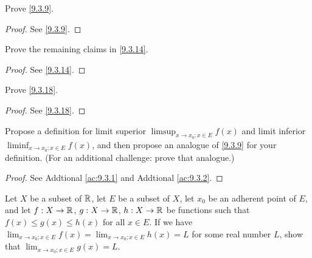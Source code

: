 \exercisesection

\begin{ex}\label{ex:9.3.1}
  Prove \cref{9.3.9}.
\end{ex}

\begin{proof}
  See \cref{9.3.9}.
\end{proof}

\begin{ex}\label{ex:9.3.2}
  Prove the remaining claims in \cref{9.3.14}.
\end{ex}

\begin{proof}
  See \cref{9.3.14}.
\end{proof}

\begin{ex}\label{ex:9.3.3}
  Prove \cref{9.3.18}.
\end{ex}

\begin{proof}
  See \cref{9.3.18}.
\end{proof}

\begin{ex}\label{ex:9.3.4}
  Propose a definition for limit superior \(\limsup_{x \to x_0 ; x \in E} f(x)\) and limit inferior \(\liminf_{x \to x_0 ; x \in E} f(x)\), and then propose an analogue of \cref{9.3.9} for your definition.
  (For an additional challenge: prove that analogue.)
\end{ex}

\begin{proof}
  See Addtional \cref{ac:9.3.1} and Addtional \cref{ac:9.3.2}.
\end{proof}

\begin{ex}\label{ex:9.3.5}
  Let \(X\) be a subset of \(\mathbb{R}\), let \(E\) be a subset of \(X\), let \(x_0\) be an adherent point of \(E\), and let \(f : X \to \mathbb{R}\), \(g : X \to \mathbb{R}\), \(h : X \to \mathbb{R}\) be functions such that \(f(x) \leq g(x) \leq h(x)\) for all \(x \in E\).
  If we have \(\lim_{x \to x_0 ; x \in E} f(x) = \lim_{x \to x_0 ; x \in E} h(x) = L\) for some real number \(L\), show that \(\lim_{x \to x_0 ; x \in E} g(x) = L\).
\end{ex}

